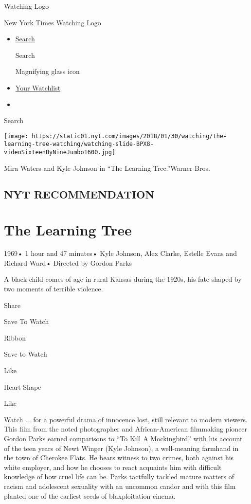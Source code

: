 \href{/watching}{}

Watching Logo

New York Times Watching Logo

\begin{itemize}
\item
  \href{/watching/search}{Search}

  Search

  Magnifying glass icon
\item
  \href{/watching/watchlist}{Your Watchlist}
\item
\end{itemize}

Search

\texttt{[image: https://static01.nyt.com/images/2018/01/30/watching/the-learning-tree-watching/watching-slide-BPX8-videoSixteenByNineJumbo1600.jpg]}

Mira Waters and Kyle Johnson in ``The Learning Tree.''Warner Bros.

\hypertarget{nyt-recommendation}{%
\subsection{NYT RECOMMENDATION}\label{nyt-recommendation}}

\hypertarget{the-learning-tree}{%
\section{The Learning Tree}\label{the-learning-tree}}

1969• 1 hour and 47 minutes• Kyle Johnson, Alex Clarke, Estelle Evans
and Richard Ward• Directed by Gordon Parks

A black child comes of age in rural Kansas during the 1920s, his fate
shaped by two moments of terrible violence.

Share

Save To Watch

Ribbon

Save to Watch

Like

Heart Shape

Like

Watch ... for a powerful drama of innocence lost, still relevant to
modern viewers. This film from the noted photographer and
African-American filmmaking pioneer Gordon Parks earned comparisons to
``To Kill A Mockingbird'' with his account of the teen years of Newt
Winger (Kyle Johnson), a well-meaning farmhand in the town of Cherokee
Flats. He bears witness to two crimes, both against his white employer,
and how he chooses to react acquaints him with difficult knowledge of
how cruel life can be. Parks tactfully tackled mature matters of racism
and adolescent sexuality with an uncommon candor and with this film
planted one of the earliest seeds of blaxploitation cinema.

